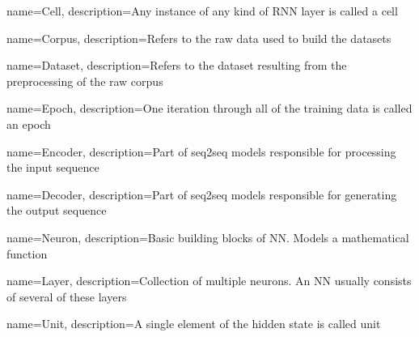 
{
	name={Cell},
	description={Any instance of any kind of RNN layer is called a cell}
}

{
	name={Corpus},
	description={Refers to the raw data used to build the datasets}
}

{
	name={Dataset},
	description={Refers to the dataset resulting from the preprocessing of the raw corpus}
}

{
  name={Epoch},
  description={One iteration through all of the training data is called an epoch}
}

{
	name={Encoder},
	description={Part of seq2seq models responsible for processing the input sequence}
}

{
	name={Decoder},
	description={Part of seq2seq models responsible for generating the output sequence}
}

{
  name={Neuron},
  description={Basic building blocks of NN. Models a mathematical function}
}

{
  name={Layer},
  description={Collection of multiple neurons. An NN usually consists of several of these layers}
}

{
	name={Unit},
	description={A single element of the hidden state is called unit}
}


